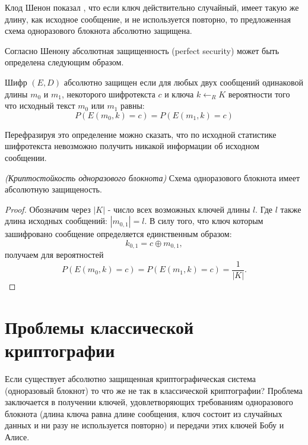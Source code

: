 Клод Шенон показал \cite{bShenonCrypto}, что если ключ действительно
случайный, имеет такую 
же длину, как исходное сообщение, и не используется повторно, то
предложенная 
схема одноразового блокнота абсолютно защищена.

Согласно Шенону абсолютная защищенность (perfect security) может быть
определена следующим образом.
\begin{definition}
Шифр $\left(E, D\right)$ абсолютно защищен если для любых двух
сообщений одинаковой длины $m_0$ и $m_1$, некоторого шифротекста $c$ и
ключа $k \leftarrow_R K$ вероятности того что исходный текст $m_0$ или
$m_1$ равны:
\begin{equation}
P\left(E\left(m_0, k\right) = c \right) = 
P\left(E\left(m_1, k\right) = c \right)
\nonumber
\end{equation}
\end{definition}
Перефразируя это определение можно сказать, что по исходной статистике
шифротекста невозможно получить никакой информации об исходном
сообщении. 

\begin{theorem}
\emph{(Криптостойкость одноразового блокнота)}
Схема одноразового блокнота имеет абсолютную защищеность.
\end{theorem}

\begin{proof}
Обозначим через $\left|K\right|$ - число всех возможных ключей длины
$l$. Где $l$ также длина исходных сообщений: $\left|m_{0,1}\right| =
l$. В силу того, что ключ которым зашифровано сообщение определяется
единственным образом:
\begin{equation}
k_{0,1} = c \oplus m_{0,1},
\nonumber
\end{equation} 
получаем для вероятностей
\begin{equation}
P\left(E\left(m_0, k\right) = c \right) = 
P\left(E\left(m_1, k\right) = c \right) = 
\frac{1}{\left|K\right|}.
\nonumber
\end{equation}
\end{proof}

\section{Проблемы классической криптографии}

Если существует абсолютно защищенная криптографическая система (одноразовый блокнот) то
что же не так в классической криптографии? Проблема заключается в
получении ключей, удовлетворяющих требованиям одноразового блокнота
(длина ключа равна длине сообщения, ключ состоит из случайных данных и
ни разу не используется повторно) и передачи этих ключей Бобу и Алисе.

